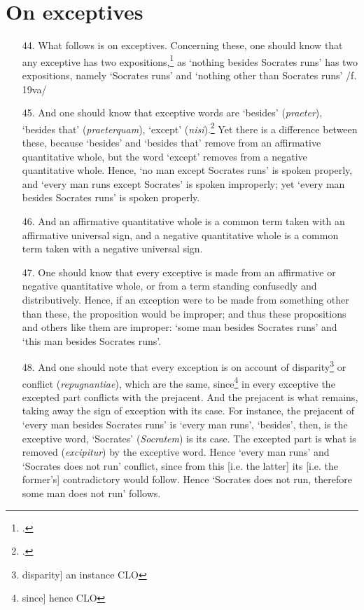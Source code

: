 \section{On exceptives}
\begin{itemize}
\item[44.] What follows is on exceptives. Concerning these, one should know that any exceptive has two expositions,\footnote{\cite[p. 165.23]{BurleyDPAL}.} as `nothing besides Socrates runs' has two expositions, namely `Socrates runs' and `nothing other than Socrates runs' /f. 19va/
\item[45.] And one should know that exceptive words are `besides' (\textit{praeter}), `besides that' (\textit{praeterquam}), `except' (\textit{nisi}).\footnote{\cite[p. 164.19]{BurleyDPAL}.} Yet there is a difference between these, because `besides' and `besides that' remove from an affirmative quantitative whole, but the word `except' removes from a negative quantitative whole. Hence, `no man except Socrates runs' is spoken properly, and `every man runs except Socrates' is spoken improperly; yet `every man besides Socrates runs' is spoken properly.
\item[46.] And an affirmative quantitative whole is a common term taken with an affirmative universal sign, and a negative quantitative whole is a common term taken with a negative universal sign.
\item[47.] One should know that every exceptive is made from an affirmative or negative quantitative whole, or from a term standing confusedly and distributively. Hence, if an exception were to be made from something other than these, the proposition would be improper; and thus these propositions and others like them are improper: `some man besides Socrates runs' and `this man besides Socrates runs'.
\item[48.] And one should note that every exception is on account of disparity\footnote{disparity] an instance CLO} or conflict (\textit{repugnantiae}), which are the same, since\footnote{since] hence CLO} in every exceptive the excepted part conflicts with the prejacent. And the prejacent is what remains, taking away the sign of exception with its case. For instance, the prejacent of `every man besides Socrates runs' is `every man runs', `besides', then, is the exceptive word, `Socrates' (\textit{Socratem}) is its case. The excepted part is what is removed (\textit{excipitur}) by the exceptive word. Hence `every man runs' and `Socrates does not run' conflict, since from this [i.e. the latter] its [i.e. the former's] contradictory would follow. Hence `Socrates does not run, therefore some man does not run' follows.

\end{itemize}
